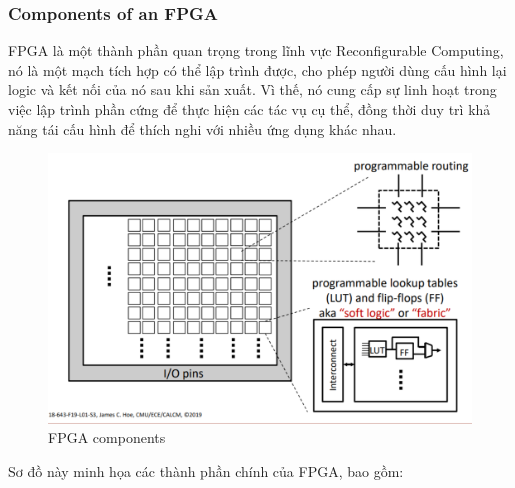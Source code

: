 \documentclass[a4paper]{article}
\begin{document}
\subsubsection{Components of an FPGA}
FPGA là một thành phần quan trọng trong lĩnh vực Reconfigurable Computing, nó là một mạch tích hợp có thể lập trình được, cho phép người dùng cấu hình lại logic và kết nối của nó sau khi sản xuất. Vì thế, nó cung cấp sự linh hoạt trong việc lập trình phần cứng để thực hiện các tác vụ cụ thể, đồng thời duy trì khả năng tái cấu hình để thích nghi với nhiều ứng dụng khác nhau.
\begin{figure}[H]
    \centering
    \includegraphics[width=1\linewidth]{assets/fpag.png}
    \caption{FPGA components}
    \label{fig:enter-label}
\end{figure}
Sơ đồ này minh họa các thành phần chính của FPGA, bao gồm:
\end{document}
